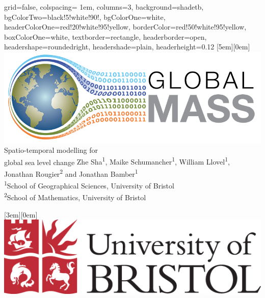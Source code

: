 \documentclass[portrait,a1paper,fontscale=0.46, margin = 5em, final]{baposter}
\begin{document}
\begin{poster}{
 grid=false,
 colspacing= 1em,
 columns=3,
 background=shadetb,
 bgColorTwo=black!5!white!90!,
 bgColorOne=white,
 headerColorOne=red!20!white!95!yellow,
 borderColor=red!50!white!95!yellow,
 boxColorOne=white,
 textborder=rectangle,
 headerborder=open,
 headershape=roundedright,
 headershade=plain,
 headerheight=0.12\textheight}
 {
      \raisebox{0em}[5em][0em]{\includegraphics[scale = 0.8]{GM-logo.png}}
 }
 {\sc Spatio-temporal modelling for \\ \vspace{0.2em} global sea level change}
 {\Large{Zhe Sha\textsuperscript{1},  Maike Schumancher\textsuperscript{1},  William Llovel\textsuperscript{1}, \\ 
 Jonathan Rougier\textsuperscript{2} and Jonathan Bamber\textsuperscript{1}
 \\
  \vspace{0.1em}
 {\textsuperscript{1}School of Geographical Sciences, University of Bristol \\
  \textsuperscript{2}School of Mathematics, University of Bristol}}\\
 \hspace{-3em} 
\noindent{}
}
 {
    \raisebox{0em}[3em][0em]{\includegraphics[scale = 0.23]{UoB-logo-colour.jpg}}

}
\end{poster}
\end{document}
